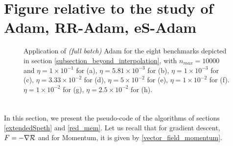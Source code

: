\documentclass[article,authoryear,jmlmc]{beg_32}             %
\begin{document}
\section{Figure relative to the study of Adam, RR-Adam, eS-Adam}
\begin{figure}[h!]
	\centering
	\scalebox{0.60}{}
        \caption{
          Application of {\em (full batch)} Adam for the eight benchmarks depicted in section \ref{subsection_beyond_interpolation}, with $n_{max}=10000$ and
 $\eta = 1   \times 10^{-1}$  for \exOne    (a),
 $\eta = 5.81\times 10^{-3}$  for \exTwo    (b),
 $\eta = 1   \times 10^{-3}$  for \exThree  (c),
 $\eta = 3.33\times 10^{-2}$  for \exFour   (d),
 $\eta = 5   \times 10^{-2}$  for \exFive   (e),
 $\eta = 1   \times 10^{-2}$  for \exSix    (f).
 $\eta = 1   \times 10^{-2}$  for \exSeven  (g),
 $\eta = 2.5 \times 10^{-2}$  for \exHeight (h).
}
	\label{adam_fb_exs}
\end{figure}

\clearpage

\section{}
\label{pseudo_code}

In this section, we present the pseudo-code of the algorithms 
of sections \ref{extendedSpeth} and \ref{red_mem}. Let us recall that for gradient descent, $F=-\nabla \mathcal{R}$ and for Momentum, it is given by \eqref{vector_field_momentum}.
\end{document}
